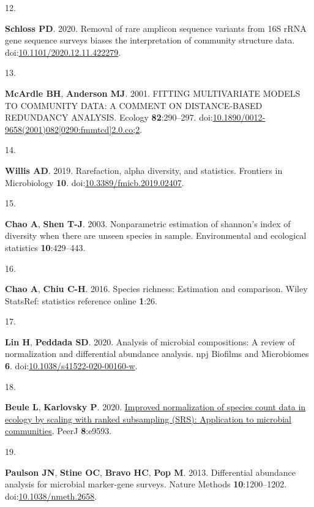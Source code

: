 \documentclass[
]{article}
\newlength{\cslhangindent}
\newlength{\csllabelwidth}
\newlength{\cslentryspacingunit} %
\newenvironment{CSLReferences}[2] %
 {%
  \setlength{\parindent}{0pt}
  \ifodd #1
  \let\oldpar\par
  \def\par{\hangindent=\cslhangindent\oldpar}
  \fi
  \setlength{\parskip}{#2\cslentryspacingunit}
 }%
 {}
\newcommand{\CSLLeftMargin}[1]{\parbox[t]{\csllabelwidth}{#1}}
\newcommand{\CSLRightInline}[1]{\parbox[t]{\linewidth - \csllabelwidth}{#1}\break}
\begin{document}
\begin{CSLReferences}{0}{1}
\leavevmode{}%
\CSLLeftMargin{12. }%
\CSLRightInline{\textbf{Schloss PD}. 2020. Removal of rare amplicon
sequence variants from 16S {rRNA} gene sequence surveys biases the
interpretation of community structure data.
doi:\href{https://doi.org/10.1101/2020.12.11.422279}{10.1101/2020.12.11.422279}.}

\leavevmode{}%
\CSLLeftMargin{13. }%
\CSLRightInline{\textbf{McArdle BH}, \textbf{Anderson MJ}. 2001.
{FITTING} {MULTIVARIATE} {MODELS} {TO} {COMMUNITY} {DATA}: A {COMMENT}
{ON} {DISTANCE}-{BASED} {REDUNDANCY} {ANALYSIS}. Ecology
\textbf{82}:290--297.
doi:\href{https://doi.org/10.1890/0012-9658(2001)082\%5B0290:fmmtcd\%5D2.0.co;2}{10.1890/0012-9658(2001)082{[}0290:fmmtcd{]}2.0.co;2}.}

\leavevmode{}%
\CSLLeftMargin{14. }%
\CSLRightInline{\textbf{Willis AD}. 2019. Rarefaction, alpha diversity,
and statistics. Frontiers in Microbiology \textbf{10}.
doi:\href{https://doi.org/10.3389/fmicb.2019.02407}{10.3389/fmicb.2019.02407}.}

\leavevmode{}%
\CSLLeftMargin{15. }%
\CSLRightInline{\textbf{Chao A}, \textbf{Shen T-J}. 2003. Nonparametric
estimation of shannon's index of diversity when there are unseen species
in sample. Environmental and ecological statistics
\textbf{10}:429--443.}

\leavevmode{}%
\CSLLeftMargin{16. }%
\CSLRightInline{\textbf{Chao A}, \textbf{Chiu C-H}. 2016. Species
richness: Estimation and comparison. Wiley StatsRef: statistics
reference online \textbf{1}:26.}

\leavevmode{}%
\CSLLeftMargin{17. }%
\CSLRightInline{\textbf{Lin H}, \textbf{Peddada SD}. 2020. Analysis of
microbial compositions: A review of normalization and differential
abundance analysis. npj Biofilms and Microbiomes \textbf{6}.
doi:\href{https://doi.org/10.1038/s41522-020-00160-w}{10.1038/s41522-020-00160-w}.}

\leavevmode{}%
\CSLLeftMargin{18. }%
\CSLRightInline{\textbf{Beule L}, \textbf{Karlovsky P}. 2020.
\href{https://doi.org/10.7717/peerj.9593}{Improved normalization of
species count data in ecology by scaling with ranked subsampling (SRS):
Application to microbial communities}. PeerJ \textbf{8}:e9593.}

\leavevmode{}%
\CSLLeftMargin{19. }%
\CSLRightInline{\textbf{Paulson JN}, \textbf{Stine OC}, \textbf{Bravo
HC}, \textbf{Pop M}. 2013. Differential abundance analysis for microbial
marker-gene surveys. Nature Methods \textbf{10}:1200--1202.
doi:\href{https://doi.org/10.1038/nmeth.2658}{10.1038/nmeth.2658}.}


\end{CSLReferences}
\end{document}

